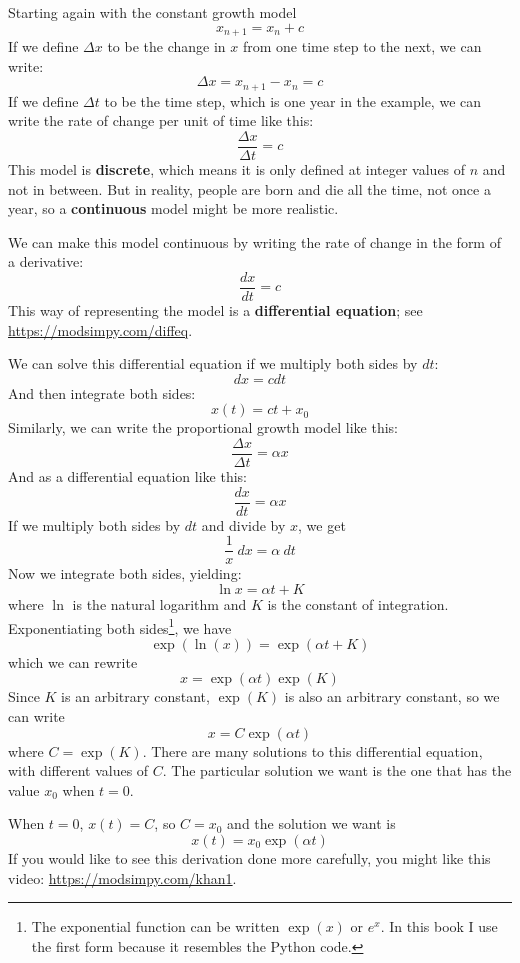 \documentclass[12pt]{book}
\theoremstyle{exercise}
\begin{document}
Starting again with the constant growth model
%
\[ x_{n+1} = x_n + c \]
%
If we define $\Delta x$ to be the change in $x$ from one time step to the next, we can write:
%
\[ \Delta x = x_{n+1} - x_n = c \]
%
If we define $\Delta t$ to be the time step, which is one year in the example, we can write the rate of change per unit of time like this:
%
\[ \frac{\Delta x}{\Delta t} = c \]
%
This model is {\bf discrete}, which means it is only defined at integer values of $n$ and not in between.  But in reality, people are born and die all the time, not once a year, so a {\bf continuous} model might be more realistic.


We can make this model continuous by writing the rate of change in the form of a derivative:
%
\[ \frac{dx}{dt} = c \]
%
This way of representing the model is a {\bf differential equation}; see \url{https://modsimpy.com/diffeq}.


We can solve this differential equation if we multiply both sides by $dt$:
%
\[ dx = c dt \]
%
And then integrate both sides:
%
\[ x(t) = c t + x_0 \]
%
Similarly, we can write the proportional growth model like this:
%
\[ \frac{\Delta x}{\Delta t} = \alpha x \]
%
And as a differential equation like this:
%
\[ \frac{dx}{dt} = \alpha x \]
%
If we multiply both sides by $dt$ and divide by $x$, we get
%
\[ \frac{1}{x}~dx = \alpha~dt \] 
%
Now we integrate both sides, yielding:
%
\[ \ln x = \alpha t + K \]
%
where $\ln$ is the natural logarithm and $K$ is the constant of integration.  Exponentiating both sides\footnote{The exponential function can be written $\exp(x)$ or $e^x$.  In this book I use the first form because it resembles the Python code. }, we have
%
\[ \exp(\ln(x)) = \exp(\alpha t + K) \]
%
which we can rewrite
%
\[ x = \exp(\alpha t) \exp(K) \]
%
Since $K$ is an arbitrary constant, $\exp(K)$ is also an arbitrary constant, so we can write
%
\[ x = C \exp(\alpha t) \]
%
where $C = \exp(K)$.  There are many solutions to this differential equation, with different values of $C$.  The particular solution we want is the one that has the value $x_0$ when $t=0$. 

When $t=0$, $x(t) = C$, so $C = x_0$ and the solution we want is
%
\[ x(t) = x_0 \exp(\alpha t) \]
%
If you would like to see this derivation done more carefully, you might like this video: \url{https://modsimpy.com/khan1}.

\end{document}
